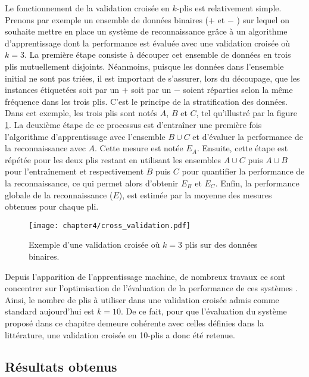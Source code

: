 Le fonctionnement de la validation croisée en $k$-plis est relativement simple. Prenons par exemple un ensemble de données binaires (\og $+$ \fg et \og $-$ \fg) sur lequel on souhaite mettre en place un système de reconnaissance grâce à un algorithme d'apprentissage dont la performance est évaluée avec une validation croisée où $k=3$. La première étape consiste à découper cet ensemble de données en trois plis mutuellement disjoints. Néanmoins, puisque les données dans l'ensemble initial ne sont pas triées, il est important de s'assurer, lors du découpage, que les instances étiquetées soit par un \og $+$ \fg soit par un \og $-$ \fg soient réparties selon la même fréquence dans les trois plis. C'est le principe de la stratification des données. Dans cet exemple, les trois plis sont notés $A$, $B$ et $C$, tel qu'illustré par la figure \ref{fig:cross_validation}. La deuxième étape de ce processus est d'entraîner une première fois l'algorithme d'apprentissage avec l'ensemble $B\cup C$ et d'évaluer la performance de la reconnaissance avec $A$. Cette mesure est notée $E_A$. Ensuite, cette étape est répétée pour les deux plis restant en utilisant les ensembles $A\cup C$ puis $A\cup B$ pour l'entraînement et respectivement $B$ puis $C$ pour quantifier la performance de la reconnaissance, ce qui permet alors d'obtenir $E_B$ et $E_C$. Enfin, la performance globale de la reconnaissance ($E$), est estimée par la moyenne des mesures obtenues pour chaque pli.

\begin{figure}[t]
	\centering
	\texttt{[image: chapter4/cross\_validation.pdf]}
        \caption{Exemple d'une validation croisée où $k=3$ plis sur des données binaires.}
	\label{fig:cross_validation}
\end{figure}

Depuis l'apparition de l'apprentissage machine, de nombreux travaux ce sont concentrer sur l'optimisation de l'évaluation de la performance de ces systèmes \citep{Witten2016}. Ainsi, le nombre de plis à utiliser dans une validation croisée admis comme standard aujourd'hui est $k=10$. De ce fait, pour que l'évaluation du système proposé dans ce chapitre demeure cohérente avec celles définies dans la littérature, une validation croisée en 10-plis a donc été retenue.

\subsection{Résultats obtenus}

